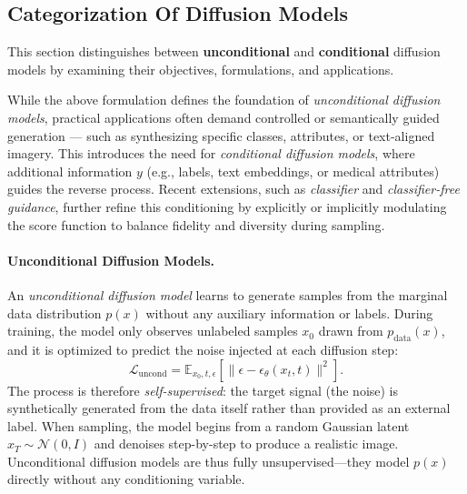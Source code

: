 \subsection{Categorization Of Diffusion Models}
This section distinguishes between \textbf{unconditional} and \textbf{conditional} diffusion models by examining their objectives, formulations, and applications.

While the above formulation defines the foundation of \emph{unconditional diffusion models}, practical applications often demand controlled or semantically guided generation — such as synthesizing specific classes, attributes, or text-aligned imagery.
This introduces the need for \emph{conditional diffusion models}, where additional information \(y\) (e.g., labels, text embeddings, or medical attributes) guides the reverse process.
Recent extensions, such as \emph{classifier} and \emph{classifier-free guidance}, further refine this conditioning by explicitly or implicitly modulating the score function to balance fidelity and diversity during sampling.

\paragraph{Unconditional Diffusion Models.}
An \textit{unconditional diffusion model} learns to generate samples from the marginal data distribution \(p(x)\) without any auxiliary information or labels. During training, the model only observes unlabeled samples \(x_0\) drawn from \(p_{\text{data}}(x)\), and it is optimized to predict the noise injected at each diffusion step:
\begin{equation}
\mathcal{L}_{\text{uncond}} = \mathbb{E}_{x_0, t, \epsilon}\!\left[\|\epsilon - \epsilon_\theta(x_t, t)\|^2\right].
\end{equation}
The process is therefore \textit{self-supervised}: the target signal (the noise) is synthetically generated from the data itself rather than provided as an external label. When sampling, the model begins from a random Gaussian latent \(x_T \sim \mathcal{N}(0, I)\) and denoises step-by-step to produce a realistic image. Unconditional diffusion models are thus fully unsupervised—they model \(p(x)\) directly without any conditioning variable.

